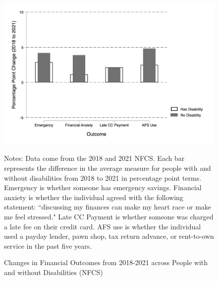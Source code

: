 \documentclass[12pt]{article}
\begin{document}
\begin{figure}[h!]\label{NFCS_Y}
\caption{Changes in Financial Outcomes from 2018-2021 across People with and without Disabilities (NFCS)}
\centering
\includegraphics[scale=0.4]{Exhibits/ChangeY_18_21_NFCSdisabilitynodis.png}
\medskip 
\begin{minipage}{0.65\textwidth} 
{\footnotesize Notes: Data come from the 2018 and 2021 NFCS. Each bar represents the difference in the average measure for people with and without disabilities from 2018 to 2021 in percentage point terms. Emergency is whether someone has emergency savings. Financial anxiety is whether the individual agreed with the following statement: ``discussing my finances can make my heart race or make me feel stressed." Late CC Payment is whether someone was charged a late fee on their credit card. AFS use is whether the individual used a payday lender, pawn shop, tax return advance, or rent-to-own service in the past five years.   \par}
\end{minipage}
\end{figure}
\end{document}
